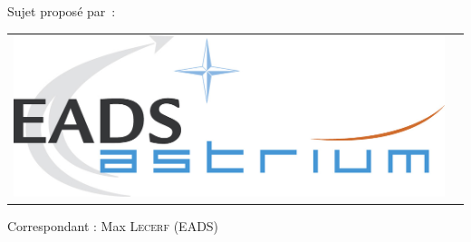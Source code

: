 \documentclass[a4paper,11pt]{article}
\numberwithin{section}{part}
\begin{document}
\hspace{1cm}Sujet propos\'e par~:
\begin{center}
\begin{tabular}{cc}
\includegraphics[scale=.4]{LOGO_EADS_ASTRIUM.jpg} 
\end{tabular}
\end{center}
\begin{center}
  \large \sffamily Correspondant : Max \textsc{Lecerf} (EADS)
\end{center}
\vfill
\vspace{3cm}
\end{document}
